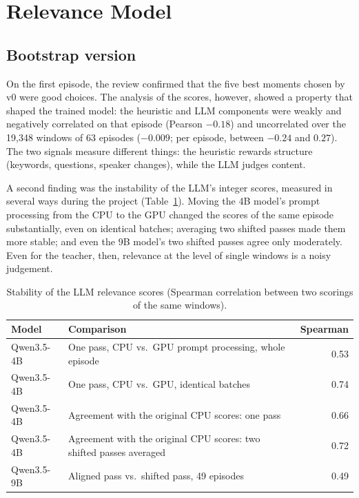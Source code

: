 \section{Relevance Model}
\label{s:res-relevance}

\subsection*{Bootstrap version}

On the first episode, the review confirmed that the five best moments chosen by v0 were good choices. The analysis of the scores, however, showed a property that shaped the trained model: the heuristic and LLM components were weakly and negatively correlated on that episode (Pearson $-0.18$) and uncorrelated over the 19{,}348 windows of 63 episodes ($-0.009$; per episode, between $-0.24$ and $0.27$). The two signals measure different things: the heuristic rewards structure (keywords, questions, speaker changes), while the LLM judges content.

A second finding was the instability of the LLM's integer scores, measured in several ways during the project (Table~\ref{tab:llm-stability}). Moving the 4B model's prompt processing from the CPU to the GPU changed the scores of the same episode substantially, even on identical batches; averaging two shifted passes made them more stable; and even the 9B model's two shifted passes agree only moderately. Even for the teacher, then, relevance at the level of single windows is a noisy judgement.

\begin{table}[H]
\centering
\caption{Stability of the LLM relevance scores (Spearman correlation between two scorings of the same windows).}
\label{tab:llm-stability}
\small
\begin{tabular}{@{}p{2.2cm}p{9.0cm}r@{}}
\toprule
\textbf{Model} & \textbf{Comparison} & \textbf{Spearman} \\
\midrule
Qwen3.5-4B & One pass, CPU vs.\ GPU prompt processing, whole episode & 0.53 \\
Qwen3.5-4B & One pass, CPU vs.\ GPU, identical batches & 0.74 \\
Qwen3.5-4B & Agreement with the original CPU scores: one pass & 0.66 \\
Qwen3.5-4B & Agreement with the original CPU scores: two shifted passes averaged & 0.72 \\
Qwen3.5-9B & Aligned pass vs.\ shifted pass, 49 episodes & 0.49 \\
\bottomrule
\end{tabular}
\end{table}

